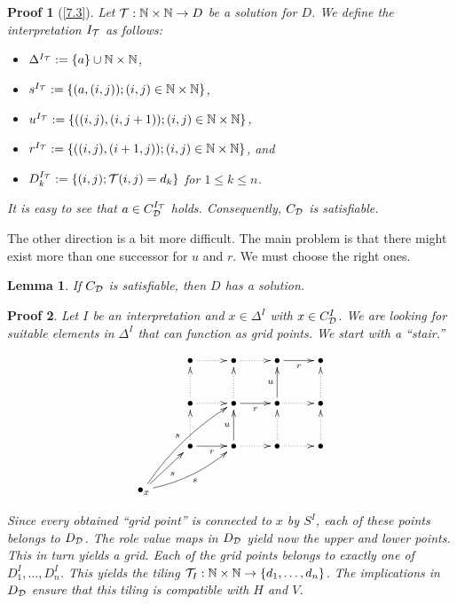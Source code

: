 \documentclass[openany]{scrbook}
\theoremstyle{break}
\newtheorem{Lemma}[Theorem]{Lemma}
\theoremstyle{nonumberbreak}
\theoremstyle{nonumberplain}
\theoremstyle{nonumberbreak}
\newtheorem{Proof}{Proof}
\newcommand{\N}{\mathbb{N}}
\newcommand{\set}[1]{\left\{#1\right\}}
\begin{document}
 \begin{Proof}[\cref{7.3}]
   Let ${\cal T}: \N \times \N \to D$ be a solution for $D$. We define
   the interpretation $I_{\cal T}$ as follows:
   \begin{itemize}
   \item $\Delta^{I_{\cal T}} := \set{a} \cup \N \times \N$,
   \item $s^{I_{\cal T}} := \set{(a, (i, j)); (i, j) \in \N \times \N}$,
   \item $u^{I_{\cal T}} := \set{((i, j), (i, j + 1)); (i, j) \in \N
       \times \N}$,
   \item $r^{I_{\cal T}} := \set{((i, j), (i + 1, j)); (i, j) \in \N
       \times \N}$, and
   \item $D_k^{I_{\cal T}} := \set{(i, j); {\cal T}(i, j) = d_k}$ for
     $1 \leq k \leq n$.
   \end{itemize}
  It is easy to see that $a \in C_{\cal D}^{I_{\cal T}}$
   holds. Consequently, $C_{\cal D}$ is satisfiable.
 \end{Proof}


 The other direction is a bit more difficult. The main problem is that
 there might exist more than one successor for $u$ and $r$. We must
 choose the right ones.

 \begin{Lemma}
   \label{7.4}
   If $C_{\cal D}$ is satisfiable, then $D$ has a solution.
 \end{Lemma}

 \begin{Proof}
   Let $I$ be an interpretation and $x \in \Delta^I$ with $x \in
   C_{\cal D}^I$. We are looking for suitable elements in $\Delta^I$
   that can function as grid points. We start with a ``stair.''

   \begin{equation*}
     \xymatrix{
       & \bullet \ar@{.>}[r] & \bullet \ar@{.>}[r] & \bullet \ar[r]_r
       & \bullet \\
       & \bullet \ar@{.>}[r] \ar@{.>}[u] & \bullet \ar@{.>}[u] \ar[r]_r & \bullet \ar[u]^u \ar@{.>}[r] &
       \bullet \ar@{.>}[u] \\
       & \bullet \ar@{.>}[u] \ar[r]_r & \bullet \ar@{.>}[r]
       \ar[u]^u & \bullet \ar@{.>}[r] \ar@{.>}[u] & \bullet
       \ar@{.>}[u] \\
       \bullet_x \ar[ur]_s \ar@/_/[urr]_s \ar@/^/[uurr]^s
     }
   \end{equation*}

   Since every obtained ``grid point'' is connected to $x$ by $S^I$,
   each of these points belongs to $D_{\cal D}$. The role value maps
   in $D_{\cal D}$ yield now the upper and lower points. This in turn
   yields a grid. Each of the grid points belongs to exactly one of
   $D_1^I, \dotsc, D_n^I$. This yields the tiling ${\cal T}_I: \N
   \times \N \to \set{d_1, \dotsc, d_n}$. The implications in $D_{\cal
     D}$ ensure that this tiling is compatible with $H$ and $V$.
 \end{Proof}
\end{document}
